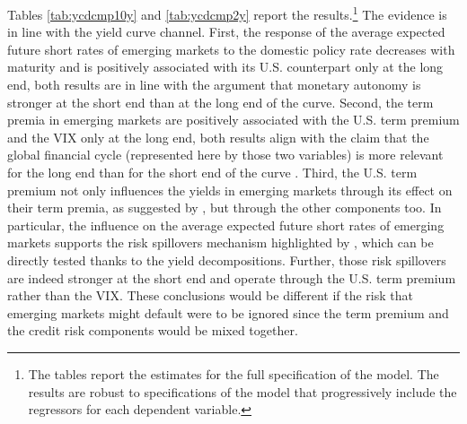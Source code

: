 {Tables \ref{tab:ycdcmp10y} and \ref{tab:ycdcmp2y} report the results.\footnote{ The tables report the estimates for the full specification of the model. The results are robust to specifications of the model that progressively include the regressors for each dependent variable.} 
The evidence is in line with the yield curve channel. 
First, the response of the average expected future short rates of emerging markets to the domestic policy rate decreases with maturity and is positively associated with its U.S. counterpart only at the long end, both results are in line with the argument that monetary autonomy is stronger at the short end than at the long end of the curve. 
Second, the term premia in emerging markets are positively associated with the U.S. term premium and the VIX only at the long end, both results align with the claim that the global financial cycle (represented here by those two variables) is more relevant for the long end than for the short end of the curve \citep{Obstfeld:2015}. 
Third, the U.S. term premium not only influences the yields in emerging markets through its effect on their term premia, as suggested by \cite{Turner:2014}, but through the other components too. 
In particular, the influence on the average expected future short rates of emerging markets supports the risk spillovers mechanism highlighted by \cite{Kalemli-Ozcan:2019}, which can be directly tested thanks to the yield decompositions. 
Further, those risk spillovers are indeed stronger at the short end and operate through the U.S. term premium rather than the VIX. 
These conclusions would be different if the risk that emerging markets might default were to be ignored since the term premium and the credit risk components would be mixed together.





}
